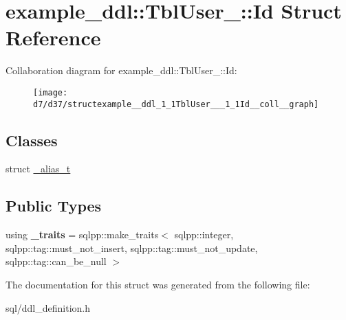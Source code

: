 \hypertarget{structexample__ddl_1_1TblUser___1_1Id}{}\section{example\+\_\+ddl\+:\+:Tbl\+User\+\_\+\+:\+:Id Struct Reference}
\label{structexample__ddl_1_1TblUser___1_1Id}


Collaboration diagram for example\+\_\+ddl\+:\+:Tbl\+User\+\_\+\+:\+:Id\+:
\nopagebreak
\begin{figure}[H]
\begin{center}
\leavevmode
\texttt{[image: d7/d37/structexample\_\_ddl\_1\_1TblUser\_\_\_1\_1Id\_\_coll\_\_graph]}
\end{center}
\end{figure}
\subsection*{Classes}
\begin{DoxyCompactItemize}
\item 
struct \hyperlink{structexample__ddl_1_1TblUser___1_1Id_1_1__alias__t}{\+\_\+alias\+\_\+t}
\end{DoxyCompactItemize}
\subsection*{Public Types}
\begin{DoxyCompactItemize}
\item 
\hypertarget{structexample__ddl_1_1TblUser___1_1Id_a6b4c7ea6f6c0a4713d6f0cd108692f6a}{}using {\bfseries \+\_\+traits} = sqlpp\+::make\+\_\+traits$<$ sqlpp\+::integer, sqlpp\+::tag\+::must\+\_\+not\+\_\+insert, sqlpp\+::tag\+::must\+\_\+not\+\_\+update, sqlpp\+::tag\+::can\+\_\+be\+\_\+null $>$\label{structexample__ddl_1_1TblUser___1_1Id_a6b4c7ea6f6c0a4713d6f0cd108692f6a}

\end{DoxyCompactItemize}


The documentation for this struct was generated from the following file\+:\begin{DoxyCompactItemize}
\item 
sql/ddl\+\_\+definition.\+h\end{DoxyCompactItemize}
